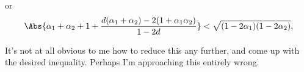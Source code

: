 {or
\begin{equation}\label{eqn:problemSet4Problem4:n}
\Abs{
\alpha_1 + \alpha_2 + 1 + \frac{d (\alpha_1 + \alpha_2) - 2 (1 + \alpha_1 \alpha_2)}{1 - 2 d}
} < 
\sqrt{( 1 - 2 \alpha_1) ( 1 - 2 \alpha_2)},
\end{equation}

It's not at all obvious to me how to reduce this any further, and come up with the desired inequality.  Perhaps I'm approaching this entirely wrong.
}
